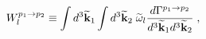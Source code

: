 \begin{equation}
W^{p_1 \to p_2}_{l} 
\equiv 
\int d^3 \widetilde{\bf k}_1
\int d^3 \widetilde{\bf k}_2
\; \widetilde{\omega}_l
\frac{
      d \Gamma^{p_1 \to p_2}
     }{
     d^3 \widetilde{\bf k}_1 d^3 \widetilde{\bf k}_2
     }\;, 
\label{Waux}
\end{equation}

